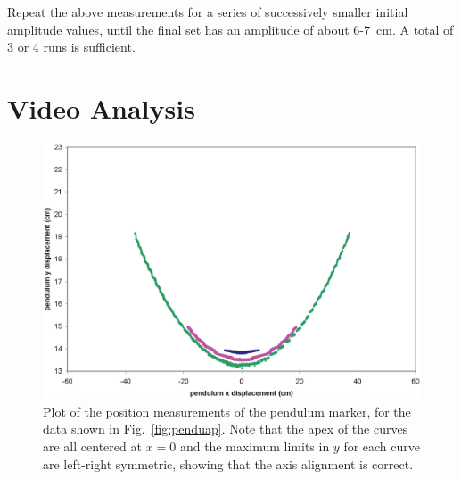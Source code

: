 \documentclass{revtex4}
\begin{document}
Repeat the above measurements for a series of successively smaller initial
amplitude values, until the final set has an amplitude of about 6-7~cm.  A
total of 3 or 4 runs is sufficient.

\section{Video Analysis}

\begin{figure}
\includegraphics[width=6in]{penduxy.eps}
\caption{\label{fig:penduxy}
Plot of the position measurements of the pendulum marker, for the data
shown in Fig.~\ref{fig:penduap}.  Note that the apex of the curves are
all centered at $x=0$ and the maximum limits in $y$ for each curve are
left-right symmetric, showing that the axis alignment is correct.
}
\end{figure}
\end{document}
